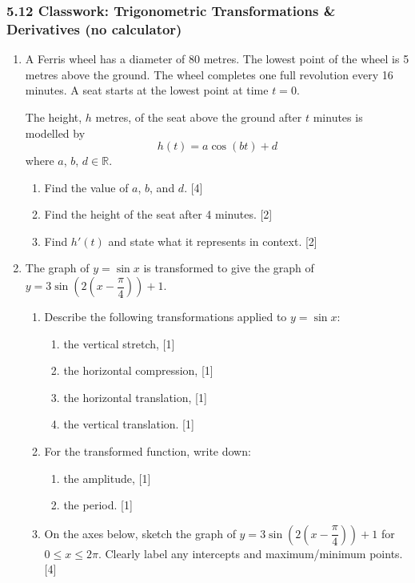 \documentclass[12pt, twoside]{article}
\begin{document}
\subsubsection*{5.12 Classwork: Trigonometric Transformations \& Derivatives
(no calculator)}

\begin{enumerate}

\item A Ferris wheel has a diameter of 80 metres. The lowest point of the wheel
is 5 metres above the ground. The wheel completes one full revolution every
16 minutes. A seat starts at the lowest point at time $t = 0$.

The height, $h$ metres, of the seat above the ground after $t$ minutes is modelled by
$$h(t) = a\cos(bt) + d$$
where $a$, $b$, $d \in \mathbb{R}$.

\begin{enumerate}
\item[(a)] Find the value of $a$, $b$, and $d$. \hfill [4]
\vspace{3.5cm}
\item[(b)] Find the height of the seat after 4 minutes. \hfill [2]
\vspace{2cm}
\item[(c)] Find $h'(t)$ and state what it represents in context. \hfill [2]
\end{enumerate}
\vspace{2.5cm}

\newpage

\item The graph of $y = \sin x$ is transformed to give the graph of
$y = 3\sin\!\left(2\!\left(x - \dfrac{\pi}{4}\right)\right) + 1$.

\begin{enumerate}
\item[(a)] Describe the following transformations applied to $y = \sin x$:
\begin{enumerate}
\item[(i)] the vertical stretch, \hfill [1]
\item[(ii)] the horizontal compression, \hfill [1]
\item[(iii)] the horizontal translation, \hfill [1]
\item[(iv)] the vertical translation. \hfill [1]
\end{enumerate}
\vspace{1cm}
\item[(b)] For the transformed function, write down:
\begin{enumerate}
\item[(i)] the amplitude, \hfill [1]
\item[(ii)] the period. \hfill [1]
\end{enumerate}
\vspace{1cm}
\item[(c)] On the axes below, sketch the graph of
$y = 3\sin\!\left(2\!\left(x - \dfrac{\pi}{4}\right)\right) + 1$
for $0 \leq x \leq 2\pi$. Clearly label any intercepts and maximum/minimum points. \hfill [4]


\end{enumerate}
\end{enumerate}
\end{document}
